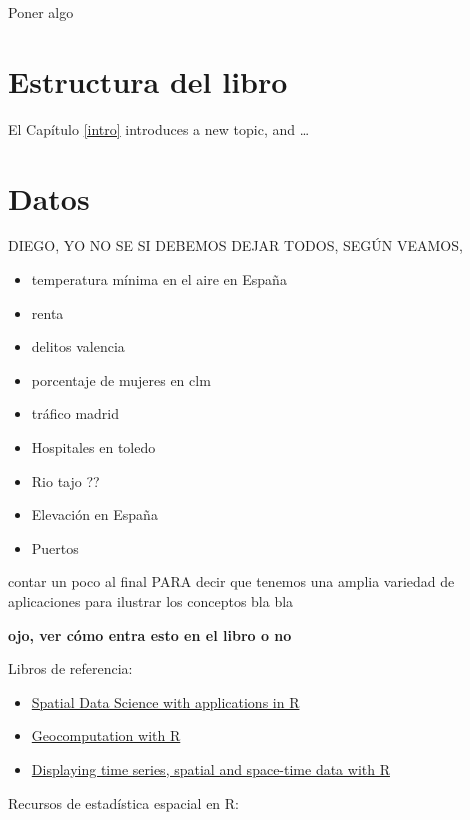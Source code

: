 \documentclass[
]{report}
\providecommand{\tightlist}{%
  \setlength{\itemsep}{0pt}\setlength{\parskip}{0pt}}
\theoremstyle{definition}
\theoremstyle{definition}
\theoremstyle{definition}
\theoremstyle{definition}
\theoremstyle{remark}
\begin{document}
Poner algo

\hypertarget{estructura-del-libro}{%
\section*{Estructura del libro}\label{estructura-del-libro}}

El Capítulo \ref{intro} introduces a new topic, and \ldots{}

\hypertarget{datos}{%
\section*{Datos}\label{datos}}

DIEGO, YO NO SE SI DEBEMOS DEJAR TODOS, SEGÚN VEAMOS,

\begin{itemize}
\tightlist
\item
  temperatura mínima en el aire en España
\item
  renta
\item
  delitos valencia
\item
  porcentaje de mujeres en clm
\item
  tráfico madrid
\item
  Hospitales en toledo
\item
  Rio tajo ??
\item
  Elevación en España
\item
  Puertos
\end{itemize}

contar un poco al final PARA decir que tenemos una amplia variedad de aplicaciones
para ilustrar los conceptos bla bla

\textbf{ojo, ver cómo entra esto en el libro o no}

Libros de referencia:

\begin{itemize}
\item
  \href{https://keen-swartz-3146c4.netlify.app/}{Spatial Data Science with applications in
  R}
\item
  \href{https://geocompr.robinlovelace.net/}{Geocomputation with R}
\item
  \href{https://oscarperpinan.github.io/bookvis/}{Displaying time series, spatial and space-time data with
  R}
\end{itemize}

Recursos de estadística espacial en R:
\end{document}
